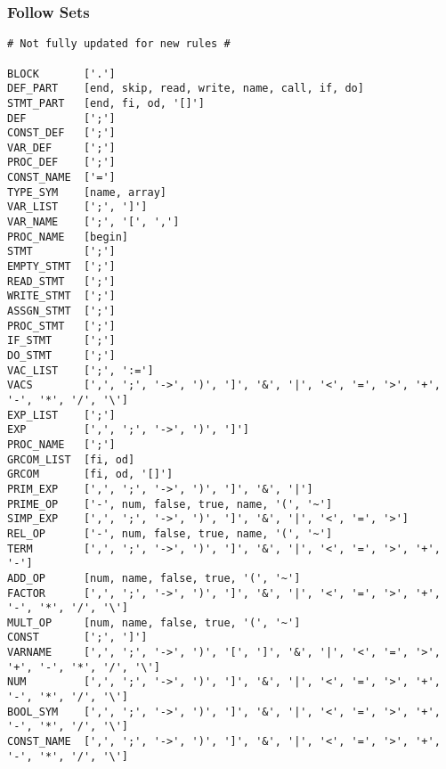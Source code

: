 \documentclass{article}
\begin{document}
\subsubsection{Follow Sets}
\begin{verbatim}
# Not fully updated for new rules #

BLOCK       ['.']
DEF_PART    [end, skip, read, write, name, call, if, do]
STMT_PART   [end, fi, od, '[]']
DEF         [';']
CONST_DEF   [';']
VAR_DEF     [';']
PROC_DEF    [';']
CONST_NAME  ['=']
TYPE_SYM    [name, array]
VAR_LIST    [';', ']']
VAR_NAME    [';', '[', ',']
PROC_NAME   [begin]
STMT        [';']
EMPTY_STMT  [';']
READ_STMT   [';']
WRITE_STMT  [';']
ASSGN_STMT  [';']
PROC_STMT   [';']
IF_STMT     [';']
DO_STMT     [';']
VAC_LIST    [';', ':=']
VACS        [',', ';', '->', ')', ']', '&', '|', '<', '=', '>', '+', '-', '*', '/', '\']
EXP_LIST    [';']
EXP         [',', ';', '->', ')', ']']
PROC_NAME   [';']
GRCOM_LIST  [fi, od]
GRCOM       [fi, od, '[]']
PRIM_EXP    [',', ';', '->', ')', ']', '&', '|']
PRIME_OP    ['-', num, false, true, name, '(', '~']
SIMP_EXP    [',', ';', '->', ')', ']', '&', '|', '<', '=', '>']
REL_OP      ['-', num, false, true, name, '(', '~']
TERM        [',', ';', '->', ')', ']', '&', '|', '<', '=', '>', '+', '-']
ADD_OP      [num, name, false, true, '(', '~']
FACTOR      [',', ';', '->', ')', ']', '&', '|', '<', '=', '>', '+', '-', '*', '/', '\']
MULT_OP     [num, name, false, true, '(', '~']
CONST       [';', ']']
VARNAME     [',', ';', '->', ')', '[', ']', '&', '|', '<', '=', '>', '+', '-', '*', '/', '\']
NUM         [',', ';', '->', ')', ']', '&', '|', '<', '=', '>', '+', '-', '*', '/', '\']
BOOL_SYM    [',', ';', '->', ')', ']', '&', '|', '<', '=', '>', '+', '-', '*', '/', '\']
CONST_NAME  [',', ';', '->', ')', ']', '&', '|', '<', '=', '>', '+', '-', '*', '/', '\']
\end{verbatim}
\end{document}
